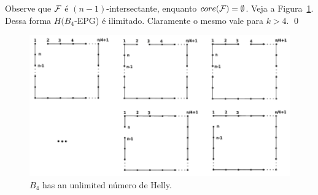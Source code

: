 Observe que $\cal{F}$ é $(n-1)$-intersectante, enquanto $core({\cal{F}})=\emptyset$. Veja a Figura~\ref{fig:figurab4}. Dessa forma $H(B_4$-EPG) é ilimitado. Claramente o mesmo vale para $k >4$. \qed  



\begin{figure}[!h]
\begin{center}












\includegraphics[width=12.5cm]{./img/b4epg.pdf}
\end{center}
\caption{$B_4$ has an unlimited número de Helly.}\label{fig:figurab4}
\end{figure}

